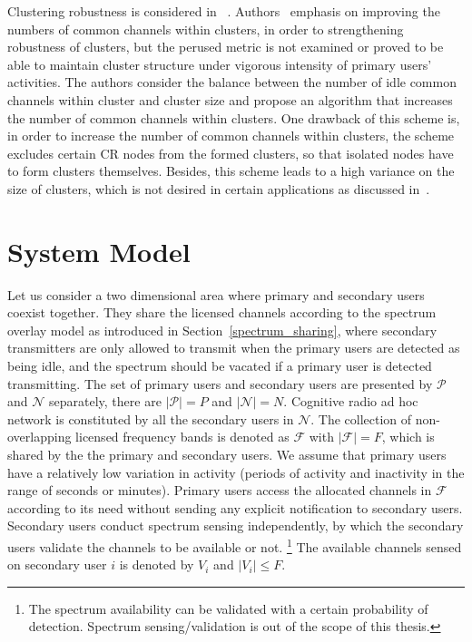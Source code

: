 Clustering robustness is considered in ~\cite{Lazos09, LIU_TMC11_2}.
Authors~\cite{Lazos09, LIU_TMC11_2} emphasis on improving the numbers of common channels within clusters, in order to strengthening robustness of clusters, but the perused metric is not examined or proved to be able to maintain cluster structure under vigorous intensity of primary users’ activities.
The authors consider the balance between the number of idle common channels within cluster and cluster size and propose an algorithm that increases the number of common channels within clusters. 
One drawback of this scheme is, in order to increase the number of common channels within clusters, the scheme excludes certain CR nodes from the formed clusters, so that isolated nodes have to form clusters themselves. 
Besides, this scheme leads to a high variance on the size of clusters, which is not desired in certain applications as discussed in~\cite{clustering_globecom11, cluster_EW10}.



\section{System Model}
\label{sec:model}
Let us consider a two dimensional area where primary and secondary users coexist together.
They share the licensed channels according to the spectrum overlay model as introduced in Section~\ref{spectrum_sharing}, where secondary transmitters are only allowed to transmit when the primary users are detected as being idle, and the spectrum should be vacated if a primary user is detected transmitting.
The set of primary users and secondary users are presented by $\mathcal{P}$ and $\mathcal{N}$ separately, there are $|\mathcal{P}| = P$ and $|\mathcal{N}| = N$.
Cognitive radio ad hoc network is constituted by all the secondary users in $\mathcal{N}$.
The collection of non-overlapping licensed frequency bands is denoted as $\mathcal{F}$ with $|\mathcal{F}| =F$, which is shared by the the primary and secondary users.
We assume that primary users have a relatively low variation in activity (periods of activity and inactivity in the range of seconds or minutes).
%
Primary users access the allocated channels in $\mathcal{F}$ according to its need without sending any explicit notification to secondary users.
Secondary users conduct spectrum sensing independently, by which the secondary users validate the channels to be available or not. \footnote{The spectrum availability can be validated with a certain probability of detection. Spectrum sensing/validation is out of the scope of this thesis.}
The available channels sensed on secondary user $i$ is denoted by $V_i$ and $\vert V_i \vert \leq F$. %


